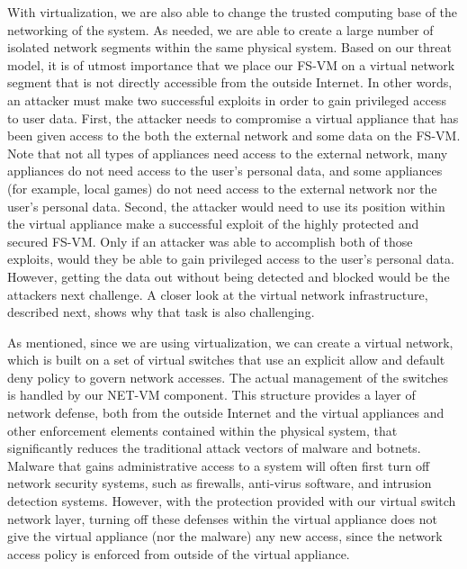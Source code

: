 With virtualization, we are also able to change the trusted computing base of the networking of the system. As needed, we are able to create a large number of isolated network segments within the same physical system. Based on our threat model, it is of utmost importance that we place our FS-VM on a virtual network segment that is not directly accessible from the outside Internet. In other words, an attacker must make two successful exploits in order to gain privileged access to user data. First, the attacker needs to compromise a virtual appliance that has been given access to the both the external network and some data on the FS-VM. Note that not all types of appliances need access to the external network, many appliances do not need access to the user's personal data, and some appliances (for example, local games) do not need access to the external network nor the user's personal data. Second, the attacker would need to use its position within the virtual appliance make a successful exploit of the highly protected and secured FS-VM. Only if an attacker was able to accomplish both of those exploits, would they be able to gain privileged access to the user's personal data. However, getting the data out without being detected and blocked would be the attackers next challenge. A closer look at the virtual network infrastructure, described next, shows why that task is also challenging.

As mentioned, since we are using virtualization, we can create a virtual network, which is built on a set of virtual switches that use an explicit allow and default deny policy to govern network accesses. The actual management of the switches is handled by our NET-VM component. This structure provides a layer of network defense, both from the outside Internet and the virtual appliances and other enforcement elements contained within the physical system, that significantly reduces the traditional attack vectors of malware and botnets. Malware that gains administrative access to a system will often first turn off network security systems, such as firewalls, anti-virus software, and intrusion detection systems. However, with the protection provided with our virtual switch network layer, turning off these defenses within the virtual appliance does not give the virtual appliance (nor the malware) any new access, since the network access policy is enforced from outside of the virtual appliance. 

